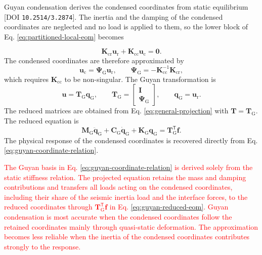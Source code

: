 \documentclass[11pt,a4paper]{article}
\numberwithin{equation}{section}
\newcommand{\rev}[1]{\textcolor{red}{#1}}
\begin{document}
Guyan condensation derives the condensed coordinates from static equilibrium \cite{Guyan1965}\,[DOI \nolinkurl{10.2514/3.2874}]. The inertia and the damping of the condensed coordinates are neglected and no load is applied to them, so the lower block of Eq. \eqref{eq:partitioned-local-eom} becomes

\begin{equation}
	\mathbf{K}_{\mathrm{cr}}\bm{u}_{\mathrm{r}}+\mathbf{K}_{\mathrm{cc}}\bm{u}_{\mathrm{c}}=\bm{0}.
	\label{eq:guyan-static-equilibrium}
\end{equation}
The condensed coordinates are therefore approximated by
\begin{equation}
	\bm{u}_{\mathrm{c}}=\bm{\Psi}_{\mathrm{G}}\bm{u}_{\mathrm{r}},
	\qquad
	\bm{\Psi}_{\mathrm{G}}=-\mathbf{K}_{\mathrm{cc}}^{-1}\mathbf{K}_{\mathrm{cr}},
	\label{eq:guyan-coordinate-relation}
\end{equation}
which requires \(\mathbf{K}_{\mathrm{cc}}\) to be non-singular.
The Guyan transformation is
\begin{equation}
	\bm{u}=\mathbf{T}_{\mathrm{G}}\bm{q}_{\mathrm{G}},
	\qquad
	\mathbf{T}_{\mathrm{G}}=
	\begin{bmatrix}
		\mathbf{I}\\
		\bm{\Psi}_{\mathrm{G}}
	\end{bmatrix},
	\qquad
	\bm{q}_{\mathrm{G}}=\bm{u}_{\mathrm{r}}.
	\label{eq:guyan-transformation}
\end{equation}
The reduced matrices are obtained from Eq. \eqref{eq:general-projection} with \(\mathbf{T}=\mathbf{T}_{\mathrm{G}}\). The reduced equation is
\begin{equation}
	\mathbf{M}_{\mathrm{G}}\ddot{\bm{q}}_{\mathrm{G}}
	+\mathbf{C}_{\mathrm{G}}\dot{\bm{q}}_{\mathrm{G}}
	+\mathbf{K}_{\mathrm{G}}\bm{q}_{\mathrm{G}}
	=\mathbf{T}_{\mathrm{G}}^{\mathsf{T}}\bm{f}.
	\label{eq:guyan-reduced-eom}
\end{equation}
The physical response of the condensed coordinates is recovered directly from Eq. \eqref{eq:guyan-coordinate-relation}.

\rev{The Guyan basis in Eq. \eqref{eq:guyan-coordinate-relation} is derived solely from the static stiffness relation. The projected equation retains the mass and damping contributions and transfers all loads acting on the condensed coordinates, including their share of the seismic inertia load and the interface forces, to the reduced coordinates through \(\mathbf{T}_{\mathrm{G}}^{\mathsf{T}}\bm{f}\) in Eq. \eqref{eq:guyan-reduced-eom}. Guyan condensation is most accurate when the condensed coordinates follow the retained coordinates mainly through quasi-static deformation. The approximation becomes less reliable when the inertia of the condensed coordinates contributes strongly to the response.}
\end{document}
